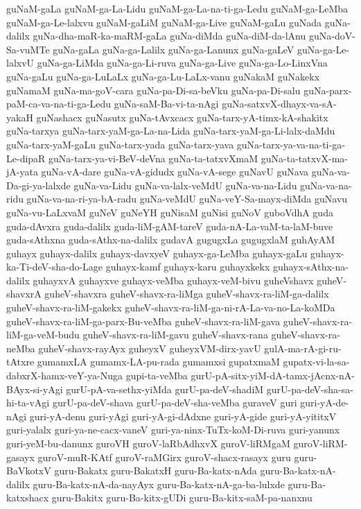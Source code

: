 {guNaM-gaLa
guNaM-ga-La-Lidu
guNaM-ga-La-na-ti-ga-Ledu
guNaM-ga-LeMba
guNaM-ga-Le-lalxvu
guNaM-gaLiM
guNaM-ga-Live
guNaM-gaLu
guNada
guNa-dalilx
guNa-dha-maR-ka-maRM-gaLa
guNa-diMda
guNa-diM-da-lAnu
guNa-doV-Sa-vuMTe
guNa-gaLa
guNa-ga-Lalilx
guNa-ga-Lanunx
guNa-gaLeV
guNa-ga-Le-lalxvU
guNa-ga-LiMda
guNa-ga-Li-ruva
guNa-ga-Live
guNa-ga-Lo-LinxVna
guNa-gaLu
guNa-ga-LuLaLx
guNa-ga-Lu-LaLx-vanu
guNakaM
guNakekx
guNamaM
guNa-ma-goV-cara
guNa-pa-Di-sa-beVku
guNa-pa-Di-salu
guNa-parx-paM-ca-va-na-ti-ga-Ledu
guNa-saM-Ba-vi-ta-nAgi
guNa-satxvX-dhayx-va-sA-yakaH
guNashacx
guNasutx
guNa-tAvxcacx
guNa-tarx-yA-timx-kA-shakitx
guNa-tarxya
guNa-tarx-yaM-ga-La-na-Lida
guNa-tarx-yaM-ga-Li-lalx-daMdu
guNa-tarx-yaM-gaLu
guNa-tarx-yada
guNa-tarx-yava
guNa-tarx-ya-va-na-ti-ga-Le-dipaR
guNa-tarx-ya-vi-BeV-deVna
guNa-ta-tatxvXmaM
guNa-ta-tatxvX-ma-jA-yata
guNa-vA-dare
guNa-vA-gidudx
guNa-vA-sege
guNavU
guNava
guNa-va-Da-gi-ya-lalxde
guNa-va-Lidu
guNa-va-lalx-veMdU
guNa-va-na-Lidu
guNa-va-na-ridu
guNa-va-na-ri-ya-bA-radu
guNa-veMdU
guNa-veY-Sa-mayx-diMda
guNavu
guNa-vu-LaLxvaM
guNeV
guNeYH
guNisaM
guNisi
guNoV
guboVdhA
guda
guda-dAvxra
guda-dalilx
guda-liM-gAM-tareV
guda-nA-La-vaM-ta-laM-buve
guda-sAthxna
guda-sAthx-na-dalilx
gudavA
gugugxLa
gugugxlaM
guhAyAM
guhayx
guhayx-dalilx
guhayx-davxyeV
guhayx-ga-LeMba
guhayx-gaLu
guhayx-ka-Ti-deV-sha-do-Lage
guhayx-kamf
guhayx-karu
guhayxkekx
guhayx-sAthx-na-dalilx
guhayxvA
guhayxve
guhayx-veMba
guhayx-veM-bivu
guheVshavx
guheV-shavxrA
guheV-shavxra
guheV-shavx-ra-liMga
guheV-shavx-ra-liM-ga-dalilx
guheV-shavx-ra-liM-gakekx
guheV-shavx-ra-liM-ga-ni-rA-La-va-no-La-koMDa
guheV-shavx-ra-liM-ga-parx-Bu-veMba
guheV-shavx-ra-liM-gava
guheV-shavx-ra-liM-ga-veM-budu
guheV-shavx-ra-liM-gavu
guheV-shavx-rana
guheV-shavx-ra-neMba
guheV-shavx-rayAyx
guheyxV
guheyxVM-dirx-yavU
gulA-ma-rA-gi-ru-tAtxre
gumamxLA
gumamx-LA-pu-rada
gumamxsi
gupatxmaM
gupatx-vi-la-sa-dabxrX-hamx-veY-ya-Nuga
gupi-ta-veMba
gurU-pA-sitx-yiM-dA-tamx-jAcnx-nA-BAyx-si-yAgi
gurU-pA-va-sethx-yiMda
gurU-pa-deV-shadiM
gurU-pa-deV-sha-sa-hi-ta-vAgi
gurU-pa-deV-shava
gurU-pa-deV-sha-veMba
guraveV
guri
guri-yA-de-nAgi
guri-yA-denu
guri-yAgi
guri-yA-gi-dAdxne
guri-yA-gide
guri-yA-yititxV
guri-yalalx
guri-ya-ne-cacx-vaneV
guri-ya-ninx-TuTx-koM-Di-ruva
guri-yanunx
guri-yeM-bu-danunx
guroVH
guroV-laRbAdhxvX
guroV-liRMgaM
guroV-liRM-gasayx
guroV-muR-KAtf
guroV-raMGirx
guroV-shacx-rasayx
guru
guru-BaVkotxV
guru-Bakatx
guru-BakatxH
guru-Ba-katx-nAda
guru-Ba-katx-nA-dalilx
guru-Ba-katx-nA-da-nayAyx
guru-Ba-katx-nA-ga-ba-lulxde
guru-Ba-katxshacx
guru-Bakitx
guru-Ba-kitx-gUDi
guru-Ba-kitx-saM-pa-nanxnu
}
